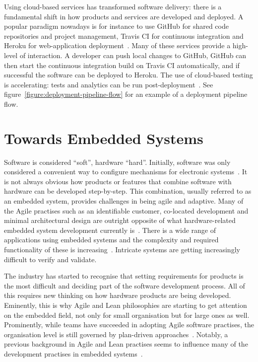 \documentclass[english]{tktltiki2}
\begin{document}
Using cloud-based services has transformed software delivery: there is a fundamental shift in how products and services are developed and deployed. A popular paradigm nowadays is for instance to use GitHub for shared code repositories and project management, Travis CI for continuous integration and Heroku for web-application deployment~\cite{GitHub, Travis, Heroku}. Many of these services provide a high-level of interaction. A developer can push local changes to GitHub, GitHub can then start the continuous integration build on Travis CI automatically, and if successful the software can be deployed to Heroku. The use of cloud-based testing is accelerating: tests and analytics can be run post-deployment~\cite{RK14}. See figure~\ref{figure:deployment-pipeline-flow} for an example of a deployment pipeline flow.


\section{Towards Embedded Systems}

Software is considered “soft”, hardware “hard”. Initially, software was only considered a convenient way to configure mechanisms for electronic systems~\cite{BE12}. It is not always obvious how products or features that combine software with hardware can be developed step-by-step. This combination, usually referred to as an embedded system, provides challenges in being agile and adaptive. Many of the Agile practises such as an identifiable customer, co-located development and minimal architectural design are outright opposite of what hardware-related embedded system development currently is~\cite{RA03}. There is a wide range of applications using embedded systems and the complexity and required functionality of these is increasing~\cite{KRM13, EHS14}. Intricate systems are getting increasingly difficult to verify and validate.

The industry has started to recognise that setting requirements for products is the most difficult and deciding part of the software development process. All of this requires new thinking on how hardware products are being developed. Eminently, this is why Agile and Lean philosophies are starting to get attention on the embedded field, not only for small organisation but for large ones as well. Prominently, while teams have succeeded in adopting Agile software practises, the organisation level is still governed by plan-driven approaches~\cite{EB12, EHS14}. Notably, a previous background in Agile and Lean practises seems to influence many of the development practises in embedded systems~\cite{KRM13}.
\end{document}
